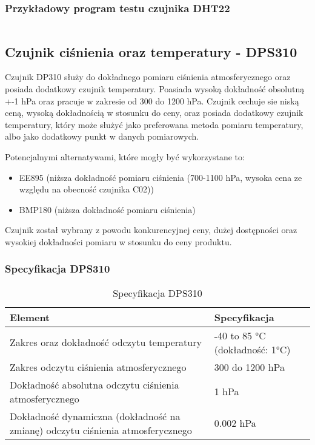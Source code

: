 \documentclass[12pt,a4paper]{article}
\begin{document}
\subsubsection{Przykładowy program testu czujnika DHT22}

\begin{code}[H]
    \inputminted[frame=lines,]{c}{../proj/dht22-test/dht22-test.ino}

    \caption{Test czujnika DHT22}
\end{code}

\subsection{Czujnik ciśnienia oraz temperatury - DPS310}

Czujnik DP310 służy do dokładnego pomiaru ciśnienia atmosferycznego oraz posiada dodatkowy czujnik temperatury. Poasiada wysoką dokładność obsolutną +-1 hPa oraz 
pracuje w zakresie od 300 do 1200 hPa. Czujnik cechuje sie niską ceną, wysoką dokładnością w stosunku do ceny, oraz posiada dodatkowy czujnik temperatury, który może 
służyć jako preferowana metoda pomiaru temperatury, albo jako dodatkowy punkt w danych pomiarowych.

Potencjalnymi alternatywami, które mogły być wykorzystane to:
\begin{itemize}
    \item EE895 (niższa dokładność pomiaru ciśnienia (700-1100 hPa, wysoka cena ze względu na obecność czujnika C02))
    \item BMP180 (niższa dokładność pomiaru ciśnienia)
\end{itemize}

Czujnik został wybrany z powodu konkurencyjnej ceny, dużej dostępności oraz wysokiej dokładności pomiaru w stosunku do ceny produktu.

\subsubsection{Specyfikacja DPS310}

\begin{table}[H]
    \centering
    \begin{tabular}{|l|l|}
        \hline
        Element & Specyfikacja \\
        \hline
        Zakres oraz dokładność odczytu temperatury & -40 to 85 °C (dokładność: 1°C) \\
        \hline
        Zakres odczytu ciśnienia atmosferycznego & 300 do 1200 hPa \\
        \hline
        Dokładność absolutna odczytu ciśnienia atmosferycznego & 1 hPa \\
        \hline
        Dokładność dynamiczna (dokładność na zmianę) odczytu ciśnienia atmosferycznego & 0.002 hPa \\
        \hline
    \end{tabular}
    \caption{Specyfikacja DPS310}
    \label{dps310-spec}
\end{table}
\end{document}
